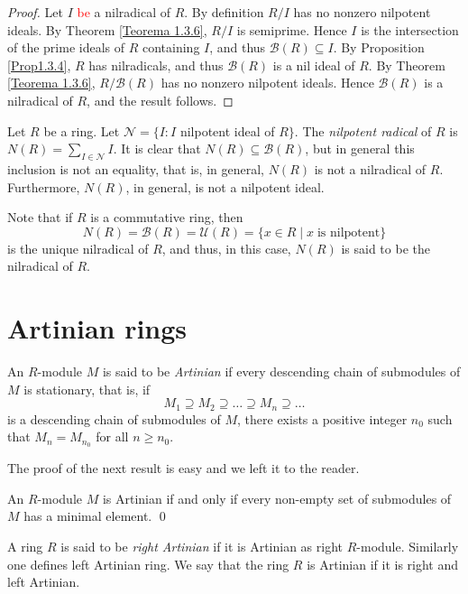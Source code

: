 \begin{proof}
Let $I$ \textcolor{red}{be} a nilradical of $R$. By definition $R/I$ has no nonzero nilpotent ideals. By Theorem \ref{Teorema 1.3.6}, $R/I$ is semiprime. Hence
$I$  is the intersection of the prime ideals of $R$ containing $I$, and thus $\mathcal{B}(R)\subseteq I$. By Proposition \ref{Prop1.3.4}, $R$ has nilradicals, and thus $\mathcal{B}(R)$ is a nil ideal of $R$. By Theorem \ref{Teorema 1.3.6}, $R/\mathcal{B}(R)$ has no nonzero nilpotent ideals. Hence $\mathcal{B}(R)$ is a nilradical of $R$, and the result follows.
\end{proof}

Let $R$ be a ring. Let $\mathcal{N}=\{ I : I$ nilpotent ideal of $R\}$. The \emph{nilpotent radical} of $R$ is
$N(R)=\sum_{I\in\mathcal{N}} I$. It is clear that $N(R)\subseteq \mathcal{B}(R)$, but in general this inclusion is not an equality, 
that is, in general, $N(R)$ is not a nilradical of $R$. Furthermore,
$N(R)$, in general, is not a nilpotent ideal.

Note that if $R$ is a commutative ring, then
$$N(R)=\mathcal{B}(R)=\mathcal{U}(R)=\{ x\in R\mid x\;\mbox{is nilpotent}\}$$
is the unique nilradical of $R$, and thus, in this case,  $N(R)$ is said to be the nilradical of $R$.

\section{Artinian rings}
An $R$-module $M$ is said to be \emph{Artinian} if every descending chain of submodules of $M$ is stationary, that is, if
$$M_1\supseteq M_2\supseteq\dots\supseteq M_n\supseteq\dots$$
is a descending chain of submodules of $M$, there exists a positive integer $n_0$ such that $M_n=M_{n_0}$ for all $n\geq n_0$.

The proof of the next result is easy and we left it to the reader.

\begin{proposition}\label{Prop1.4.1}
An $R$-module $M$ is Artinian if and only if every non-empty set of submodules of $M$ has a minimal element. \qed
\end{proposition}

A ring $R$ is said to be \emph{right Artinian} if it is Artinian as right $R$-module.
Similarly one defines left Artinian ring. We say that the ring $R$ is Artinian if it is right and left Artinian.

